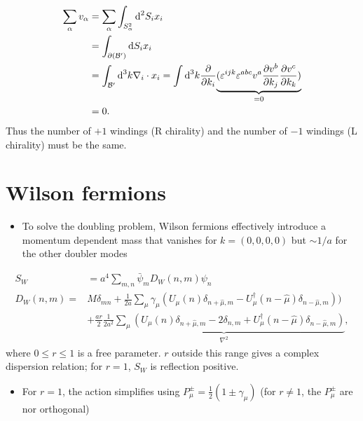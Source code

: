 \begin{align}
    \sum_\alpha v_\alpha &= \sum_\alpha \int_{S_\alpha^2}\text{d}^2S_i x_i \nonumber \\
    &= \int_{\partial({\cal B}^\prime)}\text{d}S_i x_i \nonumber \\
    &= \int_{{\cal B}^\prime}\text{d}^3 k \nabla_i \cdot x_i = \int \text{d}^3 k \frac{\partial}{\partial k_i}\underset{=0}{\underbrace{(\varepsilon^{ijk}\varepsilon^{abc}v^a \frac{\partial v^b}{\partial k_j}\frac{\partial v^c}{\partial k_k})}} \nonumber\\
    &= 0.
\end{align}
Thus the number of $+1$ windings (R chirality) and the number of $-1$ windings (L chirality) must be the same.

\section{Wilson fermions }

\begin{itemize}
  \item To solve the doubling problem, Wilson fermions effectively introduce a momentum dependent mass that vanishes for \(k=(0,0,0,0)\) but \(\sim 1 / a\) for the other doubler modes
\end{itemize}

\begin{align}
    S_W &= a^4 \sum_{m,n}\bar{\psi}_m D_W(n,m)\psi_n \nonumber \\
    D_W(n,m) =& M \delta_{mn} + \frac{1}{2a}\sum_\mu \gamma_\mu (U_\mu(n) \delta_{n + \hat{\mu}, m} - U^\dagger_\mu(n - \hat{\mu}) \delta_{n - \hat{\mu}, m}))\nonumber \\
    &+ \frac{a r}{2} \underset{\nabla^2}{\underbrace{\frac{1}{2 a^2}\sum_\mu(U_\mu(n) \delta_{n + \hat{\mu}, m} - 2 \delta_{n,m} + U^\dagger_\mu(n - \hat{\mu})\delta_{n - \hat{\mu},  m})}},
\end{align}
where $0 \leq r \leq 1$ is a free parameter. $r$ outside this range gives a complex dispersion relation; for $r=1$, $S_W$ is reflection positive.

\begin{itemize}
    \item For $r=1$, the action simplifies using $P_\mu^{\pm} = \frac{1}{2}(1 \pm \gamma_\mu)$ (for $r \neq 1$, the $P^{\pm}_\mu$ are nor orthogonal)
\end{itemize}

